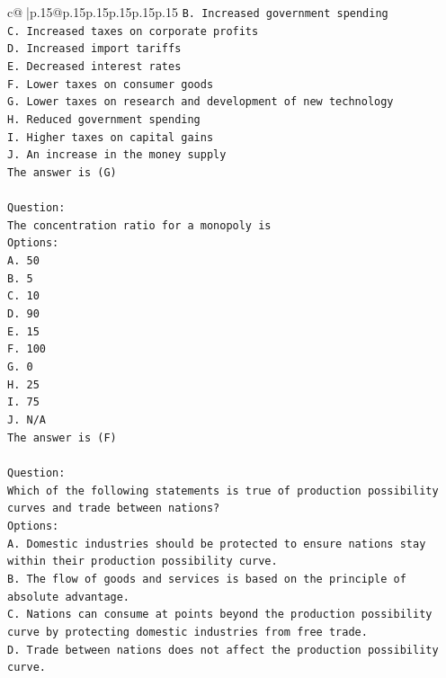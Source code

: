 \documentclass{article}
\begin{document}
{\begin{supertabular}{c@{$\;$}|p{.15\linewidth}@{}p{.15\linewidth}p{.15\linewidth}p{.15\linewidth}p{.15\linewidth}p{.15\linewidth}}
{{{\texttt{B. Increased government spending} \\
\texttt{C. Increased taxes on corporate profits} \\
\texttt{D. Increased import tariffs} \\
\texttt{E. Decreased interest rates} \\
\texttt{F. Lower taxes on consumer goods} \\
\texttt{G. Lower taxes on research and development of new technology} \\
\texttt{H. Reduced government spending} \\
\texttt{I. Higher taxes on capital gains} \\
\texttt{J. An increase in the money supply} \\
\texttt{The answer is (G)} \\
\\ 
\texttt{Question:} \\
\texttt{The concentration ratio for a monopoly is} \\
\texttt{Options:} \\
\texttt{A. 50} \\
\texttt{B. 5} \\
\texttt{C. 10} \\
\texttt{D. 90} \\
\texttt{E. 15} \\
\texttt{F. 100} \\
\texttt{G. 0} \\
\texttt{H. 25} \\
\texttt{I. 75} \\
\texttt{J. N/A} \\
\texttt{The answer is (F)} \\
\\ 
\texttt{Question:} \\
\texttt{Which of the following statements is true of production possibility curves and trade between nations?} \\
\texttt{Options:} \\
\texttt{A. Domestic industries should be protected to ensure nations stay within their production possibility curve.} \\
\texttt{B. The flow of goods and services is based on the principle of absolute advantage.} \\
\texttt{C. Nations can consume at points beyond the production possibility curve by protecting domestic industries from free trade.} \\
\texttt{D. Trade between nations does not affect the production possibility curve.} \\
}}}
\end{supertabular}}
\end{document}
